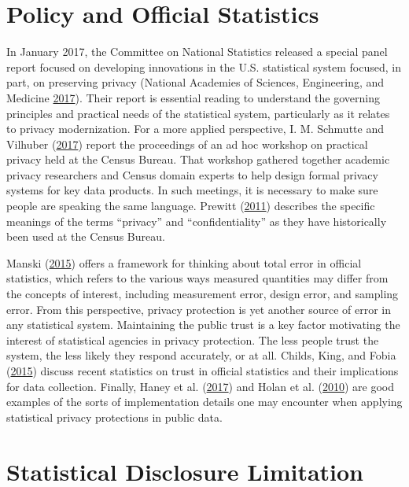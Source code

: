 \documentclass[]{article}
\begin{document}
\hypertarget{policy-and-official-statistics}{\section{Policy and
Official Statistics}\label{policy-and-official-statistics}}

In January 2017, the Committee on National Statistics released a special
panel report focused on developing innovations in the U.S. statistical
system focused, in part, on preserving privacy (National Academies of
Sciences, Engineering, and Medicine
\protect\hyperlink{ref-groves:harris-kojetin:2017}{2017}). Their report
is essential reading to understand the governing principles and
practical needs of the statistical system, particularly as it relates to
privacy modernization. For a more applied perspective, I. M. Schmutte
and Vilhuber (\protect\hyperlink{ref-Proc:NSF-Sloan:2017}{2017}) report
the proceedings of an ad hoc workshop on practical privacy held at the
Census Bureau. That workshop gathered together academic privacy
researchers and Census domain experts to help design formal privacy
systems for key data products. In such meetings, it is necessary to make
sure people are speaking the same language. Prewitt
(\protect\hyperlink{ref-prewitt:2011}{2011}) describes the specific
meanings of the terms ``privacy'' and ``confidentiality'' as they have
historically been used at the Census Bureau.

Manski (\protect\hyperlink{ref-Manski2014}{2015}) offers a framework for
thinking about total error in official statistics, which refers to the
various ways measured quantities may differ from the concepts of
interest, including measurement error, design error, and sampling error.
From this perspective, privacy protection is yet another source of error
in any statistical system. Maintaining the public trust is a key factor
motivating the interest of statistical agencies in privacy protection.
The less people trust the system, the less likely they respond
accurately, or at all. Childs, King, and Fobia
(\protect\hyperlink{ref-Childs:Confidence:SP:2015}{2015}) discuss recent
statistics on trust in official statistics and their implications for
data collection. Finally, Haney et al.
(\protect\hyperlink{ref-HaneySIGMOD2017}{2017}) and Holan et al.
(\protect\hyperlink{ref-Holan2010}{2010}) are good examples of the sorts
of implementation details one may encounter when applying statistical
privacy protections in public data.

\hypertarget{statistical-disclosure-limitation}{\section{Statistical
Disclosure Limitation}\label{statistical-disclosure-limitation}}
\end{document}
